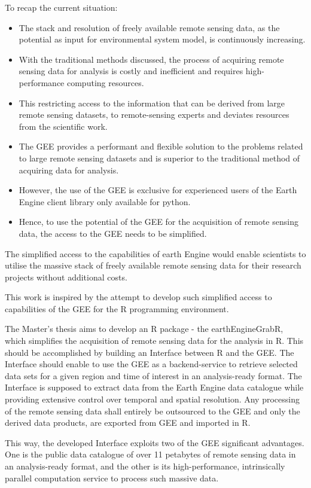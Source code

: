 To recap the current situation:
\begin{itemize}
	
	\item The stack and resolution of freely available remote sensing data, as the potential as input for environmental system model, is continuously increasing.
	\item With the traditional methods discussed, the process of acquiring remote sensing data for analysis is costly and inefficient and requires high-performance computing resources.
	\item This restricting access to the information that can be derived from large remote sensing datasets, to remote-sensing experts and deviates resources from the scientific work.
	\item The GEE provides a performant and flexible solution to the problems related to large remote sensing datasets and is superior to the traditional method of acquiring data for analysis.
	\item However, the use of the GEE is exclusive for experienced users of the Earth Engine client library only available for python.
	\item Hence, to use the potential of the GEE for the acquisition of remote sensing data, the access to the GEE needs to be simplified.
	
\end{itemize}

The simplified access to the capabilities of earth Engine would enable scientists to utilise the massive stack of freely available remote sensing data for their research projects without additional costs.

This work is inspired by the attempt to develop such simplified access to capabilities of the GEE for the R programming environment.

The Master's thesis aims to develop an R package - the earthEngineGrabR, which simplifies the acquisition of remote sensing data for the analysis in R. This should be accomplished by building an Interface between R and the GEE.
The Interface should enable to use the GEE as a backend-service to retrieve selected data sets for a given region and time of interest in an analysis-ready format. The Interface is supposed to extract data from the Earth Engine data catalogue while providing extensive control over temporal and spatial resolution. 
Any processing of the remote sensing data shall entirely be outsourced to the GEE and only the derived data products, are exported from GEE and imported in R. 

This way, the developed Interface exploits two of the GEE significant advantages. One is the public data catalogue of over 11 petabytes of remote sensing data in an analysis-ready format, and the other is its high-performance, intrinsically parallel computation service to process such massive data.
